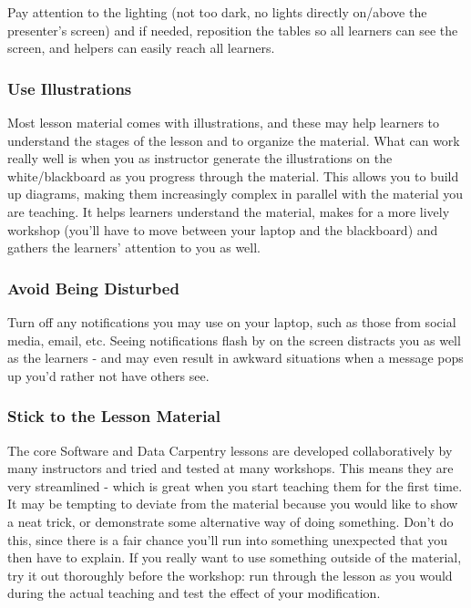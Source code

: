 Pay attention to the lighting (not too dark, no lights directly
on/above the presenter's screen) and if needed, reposition the tables
so all learners can see the screen, and helpers can easily reach all
learners.

\subsubsection*{Use Illustrations}

Most lesson material comes with illustrations, and these may help
learners to understand the stages of the lesson and to organize the
material.  What can work really well is when you as instructor
generate the illustrations on the white/blackboard as you progress
through the material.  This allows you to build up diagrams, making
them increasingly complex in parallel with the material you are
teaching.  It helps learners understand the material, makes for a more
lively workshop (you'll have to move between your laptop and the
blackboard) and gathers the learners' attention to you as well.

\subsubsection*{Avoid Being Disturbed}

Turn off any notifications you may use on your laptop, such as those
from social media, email, etc.  Seeing notifications flash by on the
screen distracts you as well as the learners - and may even result in
awkward situations when a message pops up you'd rather not have others
see.

\subsubsection*{Stick to the Lesson Material}

The core Software and Data Carpentry lessons are developed
collaboratively by many instructors and tried and tested at many
workshops.  This means they are very streamlined - which is great when
you start teaching them for the first time.  It may be tempting to
deviate from the material because you would like to show a neat trick,
or demonstrate some alternative way of doing something.  Don't do
this, since there is a fair chance you'll run into something
unexpected that you then have to explain.  If you really want to use
something outside of the material, try it out thoroughly before the
workshop: run through the lesson as you would during the actual
teaching and test the effect of your modification.

